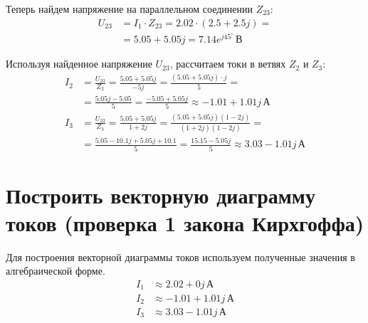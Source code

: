 \documentclass[12pt]{article}
\begin{document}
Теперь найдем напряжение на параллельном соединении $Z_{23}$:
\begin{equation*}
  \begin{aligned}
    U_{23} &= I_1 \cdot Z_{23} = 2.02 \cdot (2.5 + 2.5j) = \\
    &= 5.05 + 5.05j = 7.14e^{j45^\circ}\,\text{В}
  \end{aligned}
\end{equation*}

Используя найденное напряжение $U_{23}$, рассчитаем токи в ветвях $Z_2$ и $Z_3$:
\begin{equation*}
  \begin{aligned}
    I_2 &= \frac{U_{23}}{Z_2} = \frac{5.05 + 5.05j}{-5j} = \frac{(5.05 + 5.05j) \cdot j}{5} = \\
    &= \frac{5.05j - 5.05}{5} = \frac{-5.05 + 5.05j}{5} \approx -1.01 + 1.01j\,\text{А} \\
    I_3 &= \frac{U_{23}}{Z_3} = \frac{5.05 + 5.05j}{1 + 2j} = \frac{(5.05 + 5.05j)(1 - 2j)}{(1 + 2j)(1 - 2j)} = \\
    &= \frac{5.05 - 10.1j + 5.05j + 10.1}{5} = \frac{15.15 - 5.05j}{5} \approx 3.03 - 1.01j\,\text{А}
  \end{aligned}
\end{equation*}

\section{Построить векторную диаграмму токов (проверка 1 закона Кирхгоффа)}

Для построения векторной диаграммы токов используем полученные значения в алгебраической форме.
\begin{equation*}
  \begin{aligned}
    I_1 &\approx 2.02 + 0j\,\text{А} \\
    I_2 &\approx -1.01 + 1.01j\,\text{А} \\
    I_3 &\approx 3.03 - 1.01j\,\text{А}
  \end{aligned}
\end{equation*}
\end{document}
